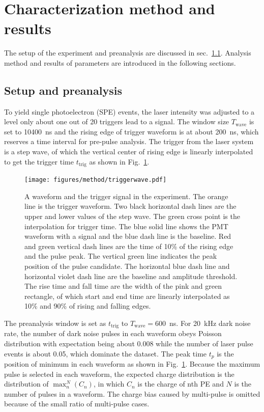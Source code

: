 \section{Characterization method and results}
\label{Method}
The setup of the experiment and preanalysis are discussed in sec.~\ref{sec:laserstage}. Analysis method and results of parameters are introduced in the following sections.
\subsection{Setup and preanalysis}
\label{sec:laserstage}

To yield single photoelectron (SPE) events, the laser intensity was adjusted to a level only about one out of 20 triggers lead to a signal. The window size $T_{\mathrm{wave}}$ is set to \SI{10400}{ns} and the rising edge of trigger waveform is at about \SI{200}{ns}, which reserves a time interval for pre-pulse analysis. The trigger from the laser system is a step wave, of which the vertical center of rising edge is linearly interpolated to get the trigger time $t_{\mathrm{trig}}$ as shown in Fig.~\ref{fig:triggertime}.
\begin{figure}[!htbp]
    \centering
    \texttt{[image: figures/method/triggerwave.pdf]}
    \caption{A waveform and the trigger signal in the experiment. The orange line is the trigger waveform. Two black horizontal dash lines are the upper and lower values of the step wave. The green cross point is the interpolation for trigger time. The blue solid line shows the PMT waveform with a signal and the blue dash line is the baseline. Red and green vertical dash lines are the time of 10\% of the rising edge and the pulse peak. The vertical green line indicates the peak position of the pulse candidate. The horizontal blue dash line and horizontal violet dash line are the baseline and amplitude threshold. The rise time and fall time are the width of the pink and green rectangle, of which start and end time are linearly interpolated as 10\% and 90\% of rising and falling edges.}
    \label{fig:triggertime}
\end{figure}

The preanalysis window is set as $t_{\mathrm{trig}}$ to $T_{\mathrm{wave}}=$\SI{600}{ns}. For \SI{20}{kHz} dark noise rate, the number of dark noise pulses in each waveform obeys Poisson distribution with expectation being about 0.008 while the number of laser pulse events is about 0.05, which dominate the dataset. The peak time $t_p$ is the position of minimum in each waveform as shown in Fig.~\ref{fig:triggertime}. Because the maximum pulse is selected in each waveform, the expected charge distribution is the distribution of $\max_n^N(C_n)$, in which $C_n$ is the charge of nth PE and $N$ is the number of pulses in a waveform. The charge bias caused by multi-pulse is omitted because of the small ratio of multi-pulse cases.

